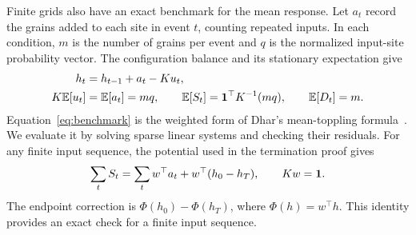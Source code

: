 Finite grids also have an exact benchmark for the mean response. Let $a_t$ record the grains added to each site in event $t$, counting repeated inputs. In each condition, $m$ is the number of grains per event and $q$ is the normalized input-site probability vector. The configuration balance and its stationary expectation give
\begin{align}
 h_t&=h_{t-1}+a_t-Ku_t,\\
 K\mathbb E[u_t]&=\mathbb E[a_t]=m q,\qquad
 \mathbb E[S_t]=\mathbf 1^\top K^{-1}(mq),\qquad \mathbb E[D_t]=m.\label{eq:benchmark}
\end{align}
Equation~\eqref{eq:benchmark} is the weighted form of Dhar's mean-toppling formula~\cite[Theorem 2.18]{jarai2018}. We evaluate it by solving sparse linear systems and checking their residuals. For any finite input sequence, the potential used in the termination proof gives
\begin{equation}
 \sum_t S_t=\sum_t w^\top a_t+w^\top(h_0-h_T),\qquad Kw=\mathbf 1.\label{eq:potentialbalance}
\end{equation}
The endpoint correction is $\Phi(h_0)-\Phi(h_T)$, where $\Phi(h)=w^\top h$. This identity provides an exact check for a finite input sequence.
